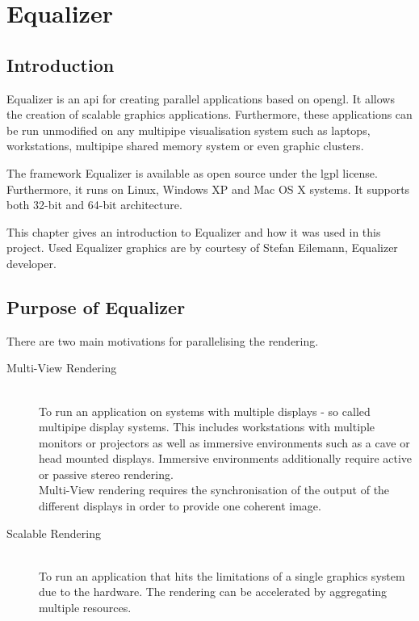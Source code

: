 \chapter{Equalizer}

\section{Introduction}
Equalizer is an \gls{api} for creating parallel applications based on \gls{opengl}. It allows the creation of scalable graphics applications. Furthermore, these applications can be run unmodified on any multipipe visualisation system such as laptops, workstations, multipipe shared memory system or even graphic clusters. 

The framework Equalizer is available as open source under the \gls{lgpl} license. Furthermore, it runs on Linux, Windows XP and Mac OS X systems. It supports both 32-bit and 64-bit architecture.

This chapter gives an introduction to Equalizer and how it was used in this project. Used Equalizer graphics are by courtesy of Stefan Eilemann, Equalizer developer.

\section{Purpose of Equalizer}
There are two main motivations for parallelising the rendering.

\begin{description}
	\item[Multi-View Rendering] \hfill\\To run an application on systems with multiple displays - so called multipipe display systems. This includes workstations with multiple monitors or projectors as well as immersive environments such as a \gls{cave} or head mounted displays. Immersive environments additionally require active or passive stereo rendering. \\Multi-View rendering requires the synchronisation of the output of the different displays in order to provide one coherent image.
	\item[Scalable Rendering] \hfill\\To run an application that hits the limitations of a single graphics system due to the hardware. The rendering can be accelerated by aggregating multiple resources.
\end{description}

